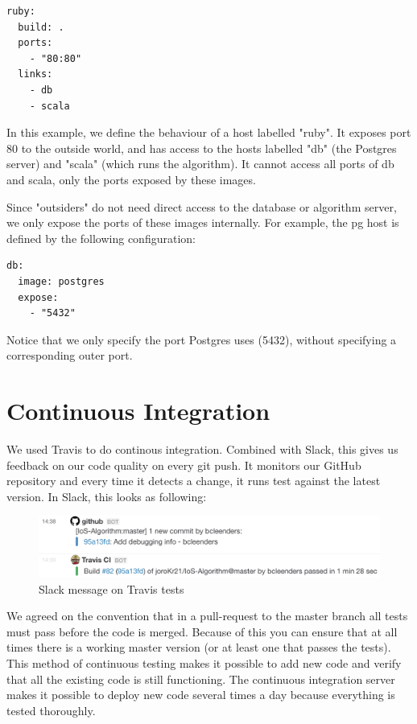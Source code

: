\begin{verbatim}
ruby:
  build: .
  ports:
    - "80:80"
  links:
    - db
    - scala
\end{verbatim}

In this example, we define the behaviour of a host labelled "ruby". It exposes port 80 to the outside world, and has access to the hosts labelled "db" (the Postgres server) and "scala" (which runs the algorithm). It cannot access all ports of db and scala, only the ports exposed by these images.

Since "outsiders" do not need direct access to the database or algorithm server, we only expose the ports of these images internally. For example, the pg host is defined by the following configuration:

\begin{verbatim}
db:
  image: postgres
  expose:
    - "5432"
\end{verbatim}

Notice that we only specify the port Postgres uses (5432), without specifying a corresponding outer port.

\section{Continuous Integration}
We used Travis to do continous integration. Combined with Slack, this gives us feedback on our code quality on every git push. It monitors our GitHub repository and every time it detects a change, it runs test against the latest version. In Slack, this looks as following:

\begin{figure}[H]
	\caption{Slack message on Travis tests}
	\label{fig:slack_ci}
	\centering
	\includegraphics[width=14cm]{img/slack_ci}
\end{figure}

We agreed on the convention that in a pull-request to the master branch all tests must pass before the code is merged. Because of this you can ensure that at all times there is a working master version (or at least one that passes the tests). This method of continuous testing makes it possible to add new code and verify that all the existing code is still functioning. The continuous integration server makes it possible to deploy new code several times a day because everything is tested thoroughly.

